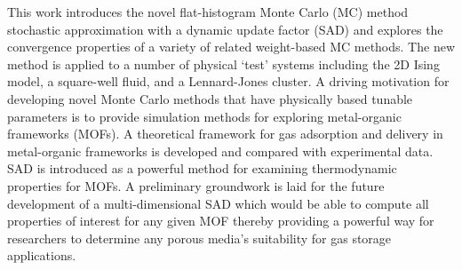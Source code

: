 This work introduces the novel flat-histogram Monte Carlo (MC) method
stochastic approximation with a dynamic update factor (SAD) and explores the
convergence properties of a variety of related weight-based MC methods. The new
method is applied to a number of physical `test’ systems including the 2D Ising
model, a square-well fluid, and a Lennard-Jones cluster. A driving motivation
for developing novel Monte Carlo methods that have physically based tunable
parameters is to provide simulation methods for exploring metal-organic
frameworks (MOFs). A theoretical framework for gas adsorption and delivery in
metal-organic frameworks is developed and compared with experimental data. SAD
is introduced as a powerful method for examining thermodynamic properties for
MOFs. A preliminary groundwork is laid for the future development of a
multi-dimensional SAD which would be able to compute all properties of interest
for any given MOF thereby providing a powerful way for researchers to determine
any porous media's suitability for gas storage applications.